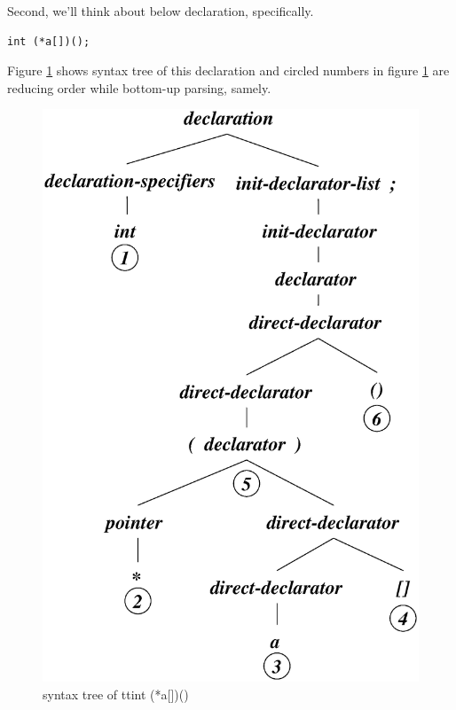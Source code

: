Second, we'll think about below declaration, specifically.
\begin{verbatim}
int (*a[])();
\end{verbatim}
Figure \ref{decl_e003} shows syntax tree of this declaration
and circled numbers in figure \ref{decl_e003} are reducing order
while bottom-up parsing, samely.
\begin{figure}[htbp]
\begin{center}
\includegraphics[width=1.0125\linewidth,height=1.4175\linewidth]{decl003.eps}
\caption{syntax tree of {tt{int (*a[])()}}}
\label{decl_e003}
\end{center}
\end{figure}
